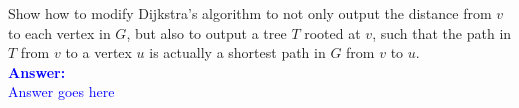 \item{}
Show how to modify Dijkstra's algorithm to not only output the distance from $v$
to each vertex in $G$, but also to output a tree $T$ rooted at $v$, such that
the path in $T$ from $v$ to a vertex $u$ is actually a shortest path in $G$
from $v$ to $u$.\\[12pt]
\ifanswers
\textcolor{blue}{
\textbf{Answer:}\\[6pt]
Answer goes here
}
\newpage
\fi
